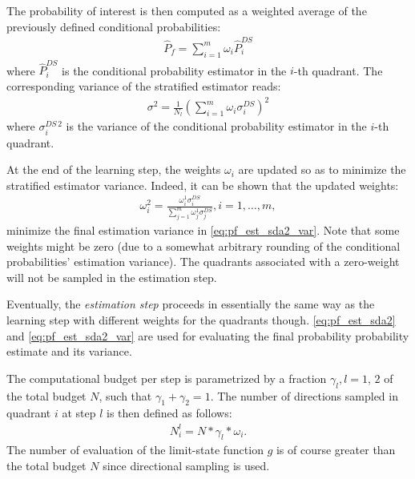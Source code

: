 {The probability of interest is then computed as a weighted average of the previously defined conditional probabilities:
\begin{eqnarray} \label{eq:pf_est_sda2}
  \hat P_f = \sum\limits_{i=1}^m \omega_i \hat P_i^{DS}
\end{eqnarray}
where $\hat P_i^{DS}$ is the conditional probability estimator in the $i$-th quadrant. The corresponding variance of the stratified estimator reads:
\begin{eqnarray*}
  \sigma^2 = \frac{1}{N_l} \left( \sum\limits_{i=1}^m \omega_i \sigma_i^{DS} \right) ^2
\end{eqnarray*} \label{eq:pf_est_sda2_var}
where $\sigma_i^{DS\,2}$ is the variance of the conditional probability estimator in the $i$-th quadrant.\par

At the end of the learning step, the weights $\omega_i$ are updated so as to minimize the stratified estimator variance. Indeed, it can be shown that the updated weights:
\begin{eqnarray*}
  \omega^2_i = \frac{\omega^1_i \sigma_i^{DS}}{\sum\limits_{j=1}^m \omega^1_j \sigma_j^{DS}}, i = 1, \ldots, m,
\end{eqnarray*}
minimize the final estimation variance in \eqref{eq:pf_est_sda2_var}. Note that some weights might be zero (due to a somewhat arbitrary rounding of the conditional probabilities' estimation variance). The quadrants associated with a zero-weight will not be sampled in the estimation step.\par

Eventually, the \emph{estimation step} proceeds in essentially the same way as the learning step with different weights for the quadrants though. \eqref{eq:pf_est_sda2} and \eqref{eq:pf_est_sda2_var} are used for evaluating the final probability probability estimate and its variance.\par

The computational budget per step is parametrized by a fraction $\gamma_l, l = 1,\,2$ of the total budget $N$, such that $\gamma_1 + \gamma_2 = 1$. The number of directions sampled in quadrant $i$ at step $l$ is then defined as follows:
\begin{eqnarray*}
  N^l_i = N * \gamma_l * \omega_i.
\end{eqnarray*}
The number of evaluation of the limit-state function $g$ is of course greater than the total budget $N$ since directional sampling is used.\par

}

